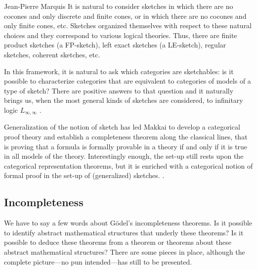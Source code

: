 \begin{artengenv}{Jean-Pierre Marquis}
It is natural to consider sketches in which there are no cocones and only discrete and finite cones, or in which there are no cocones and only finite cones, etc. Sketches organized themselves with respect to these natural choices and they correspond to various logical theories. Thus, there are finite product sketches (a FP-sketch), left exact sketches (a LE-sketch), regular sketches, coherent sketches, etc. 

In this framework, it is natural to ask which categories are sketchables: is it possible to characterize categories that are equivalent to categories of models of a type of sketch? There are positive answers to that question and it naturally brings us, when the most general kinds of sketches are considered, to infinitary logic $L_{\infty, \infty}$ \parencite[see][]{Lair1981,Makkai1989}. 

Generalization of the notion of sketch has led Makkai to develop a categorical proof theory and establish a completeness theorem along the classical lines, that is proving that a formula is formally provable in a theory if and only if it is true in all models of the theory. Interestingly enough, the set-up still rests upon the categorical representation theorems, but it is enriched with a categorical notion of formal proof in the set-up of (generalized) sketches. \parencite[see][]{Makkai1997a,Makkai1997b,Makkai1997c}. 

\subsection{Incompleteness}

We  have to say a few words about Gödel's incompleteness theorems. Is it possible to identify abstract mathematical structures that underly these theorems? Is it possible to deduce these theorems from a theorem or theorems about these abstract mathematical structures? There are some pieces in place, although the complete picture---no pun intended---has still to be presented.


\end{artengenv}
